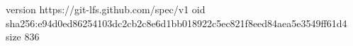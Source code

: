 version https://git-lfs.github.com/spec/v1
oid sha256:e94d0ed86254103dc2cb2c8e6d1bb018922c5ec821f8eed84aea5e3549ff61d4
size 836
